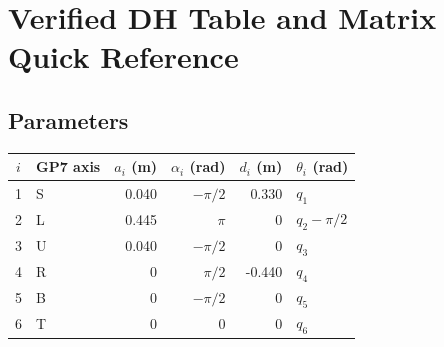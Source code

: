 \chapter{Verified DH Table and Matrix Quick Reference}
\label{app:dh}

\section{Parameters}
\begin{center}
\begin{tabular}{c l r r r l}
\toprule $i$ & GP7 axis & $a_i$ (m) & $\alpha_i$ (rad) & $d_i$ (m) & $\theta_i$ (rad)\\\midrule
1&S&0.040&$-\pi/2$&0.330&$q_1$\\
2&L&0.445&$\pi$&0&$q_2-\pi/2$\\
3&U&0.040&$-\pi/2$&0&$q_3$\\
4&R&0&$\pi/2$&-0.440&$q_4$\\
5&B&0&$-\pi/2$&0&$q_5$\\
6&T&0&0&0&$q_6$\\\bottomrule
\end{tabular}
\end{center}

